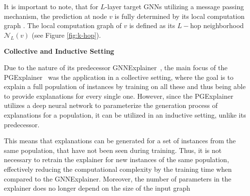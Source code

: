 It is important to note, that for $L$-layer target GNNs utilizing a message passing mechanism, the prediction at node $v$ is fully determined by its local computation graph \cite{ying2019gnnexplainer}. The local computation graph of $v$ is defined as its $L-$hop neighborhood $\mathcal{N}_L(v)$ (see Figure \ref{fig:k-hop}).\bigskip

\textbf{Collective and Inductive Setting}\par
Due to the nature of its predecessor GNNExplainer~\cite{ying2019gnnexplainer}, the main focus of the PGExplainer~\cite{luo2020parameterized} was the application in a collective setting, where the goal is to explain a full population of instances by training on all these and thus being able to provide explanations for every single one. However, since the PGExplainer utilizes a deep neural network to parameterize the generation process of explanations for a population, it can be utilized in an inductive setting, unlike its predecessor. 

This means that explanations can be generated for a set of instances from the same population, that have not been seen during training. Thus, it is not necessary to retrain the explainer for new instances of the same population, effectively reducing the computational complexity by the training time when compared to the GNNExplainer. Moreover, the number of parameters in the explainer does no longer depend on the size of the input graph


